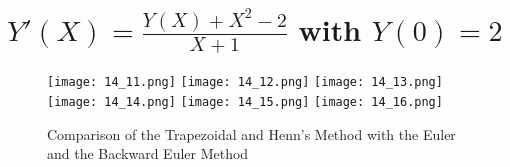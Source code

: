 \documentclass{article}
\begin{document}
\newpage
\section{$Y'(X) = \frac{Y(X)+X^2-2}{X+1}$ with $Y(0) = 2$}
\begin{figure}[!h]
    \centering
    \texttt{[image: 14\_11.png]}
    \texttt{[image: 14\_12.png]}
    \texttt{[image: 14\_13.png]}
    \texttt{[image: 14\_14.png]}
    \texttt{[image: 14\_15.png]}
    \texttt{[image: 14\_16.png]}
    \caption{Comparison of the Trapezoidal and Henn's Method with the Euler and the Backward Euler Method}
\end{figure}
\end{document}
